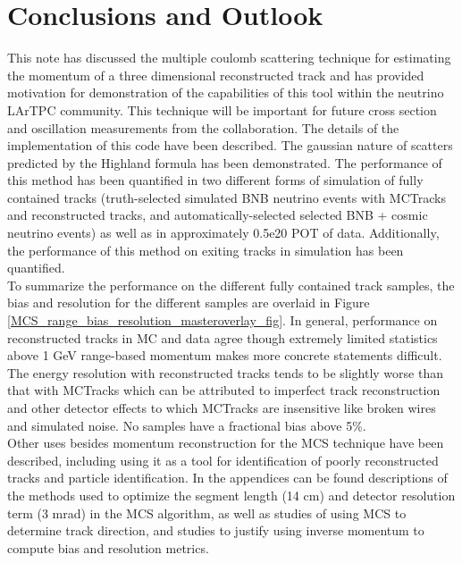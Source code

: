 \section{Conclusions and Outlook}\label{conclusion_section}

This note has discussed the multiple coulomb scattering technique for estimating the momentum of a three dimensional reconstructed track and has provided motivation for demonstration of the capabilities of this tool within the neutrino LArTPC community. This technique will be important for future cross section and oscillation measurements from the {\ub} collaboration. The details of the implementation of this code have been described. The gaussian nature of scatters predicted by the Highland formula has been demonstrated. The performance of this method has been quantified in two different forms of simulation of fully contained tracks (truth-selected simulated BNB neutrino events with {\sc MCTracks} and reconstructed tracks, and automatically-selected selected BNB + cosmic neutrino events) as well as in approximately 0.5e20 POT of {\ub} data. Additionally, the performance of this method on exiting tracks in simulation has been quantified.\\

To summarize the performance on the different fully contained track samples, the bias and resolution for the different samples are overlaid in Figure \ref{MCS_range_bias_resolution_masteroverlay_fig}. In general, performance on reconstructed tracks in MC and data agree though extremely limited statistics above 1 GeV range-based momentum makes more concrete statements difficult. The energy resolution with reconstructed tracks tends to be slightly worse than that with {\sc MCTracks} which can be attributed to imperfect track reconstruction and other detector effects to which {\sc MCTracks} are insensitive like broken wires and simulated noise. No samples have a fractional bias above 5\%.\\

Other uses besides momentum reconstruction for the MCS technique have been described, including using it as a tool for identification of poorly reconstructed tracks and particle identification. In the appendices can be found descriptions of the methods used to optimize the segment length (14 cm) and detector resolution term (3 mrad) in the MCS algorithm, as well as studies of using MCS to determine track direction, and studies to justify using inverse momentum to compute bias and resolution metrics.\\

